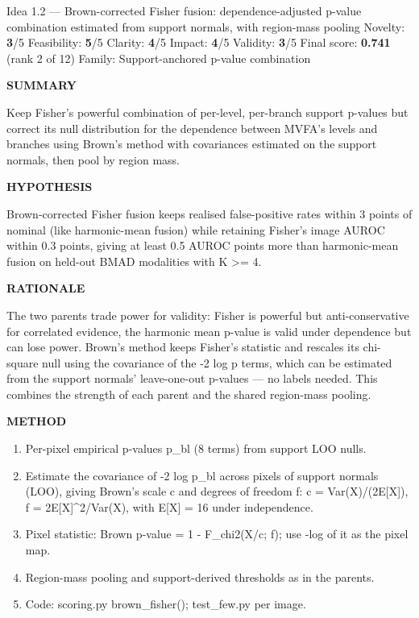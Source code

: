 \documentclass[11pt,a4paper]{article}
\newcommand{\lbl}[1]{{\sffamily\footnotesize\bfseries\color{muted}\MakeUppercase{#1}}\par}
\begin{document}
\begin{ideabox}{Idea 1.2 — Brown-corrected Fisher fusion: dependence-adjusted p-value combination estimated from support normals, with region-mass pooling}
{\small Novelty: \textbf{3}/5 \quad Feasibility: \textbf{5}/5 \quad Clarity: \textbf{4}/5 \quad Impact: \textbf{4}/5 \quad Validity: \textbf{3}/5 \quad Final score: \textbf{0.741} (rank 2 of 12) \quad Family: Support-anchored p-value combination}\par\smallskip
\lbl{Summary}Keep Fisher's powerful combination of per-level, per-branch support p-values but correct its null distribution for the dependence between MVFA's levels and branches using Brown's method with covariances estimated on the support normals, then pool by region mass.

\lbl{Hypothesis}Brown-corrected Fisher fusion keeps realised false-positive rates within 3 points of nominal (like harmonic-mean fusion) while retaining Fisher's image AUROC within 0.3 points, giving at least 0.5 AUROC points more than harmonic-mean fusion on held-out BMAD modalities with K \textgreater{}= 4.

\lbl{Rationale}The two parents trade power for validity: Fisher is powerful but anti-conservative for correlated evidence, the harmonic mean p-value is valid under dependence but can lose power. Brown's method keeps Fisher's statistic and rescales its chi-square null using the covariance of the -2 log p terms, which can be estimated from the support normals' leave-one-out p-values — no labels needed. This combines the strength of each parent and the shared region-mass pooling.

\lbl{Method}\begin{enumerate}[leftmargin=1.6em,itemsep=1pt,topsep=2pt]
\item Per-pixel empirical p-values p\_\allowbreak{}bl (8 terms) from support LOO nulls.
\item Estimate the covariance of -2 log p\_\allowbreak{}bl across pixels of support normals (LOO), giving Brown's scale c and degrees of freedom f: c = Var(X)/(2E[X]), f = 2E[X]\textasciicircum{}2/Var(X), with E[X] = 16 under independence.
\item Pixel statistic: Brown p-value = 1 - F\_\allowbreak{}chi2(X/c; f); use -log of it as the pixel map.
\item Region-mass pooling and support-derived thresholds as in the parents.
\item Code: scoring.py brown\_\allowbreak{}fisher(); test\_\allowbreak{}few.py per image.
\end{enumerate}


\end{ideabox}
\end{document}
